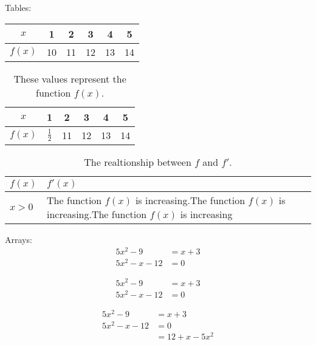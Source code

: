 \documentclass[11pt]{article}
\begin{document}

Tables:\\

\begin{tabular}{|c||c|c|c|c|c|}
\hline
$x$ &1&2&3&4&5 \\ 
\hline
$f(x)$ &10&11&12&13&14 \\
\hline
\end{tabular}

\vspace{1 cm}
\begin{table}[H]
\centering
\def\arraystretch{1.5}
\begin{tabular}{|c||c|c|c|c|c|}
\hline
$x$ &1&2&3&4&5 \\
\hline
$f(x)$ &$\frac{1}{2}$&11&12&13&14 \\ 
\hline
\end{tabular}
\caption{These values represent the function $f(x)$.}
\end{table}

\begin{table}[H]
\centering
\caption{The realtionship between $f$ and $f'$.}
\def\arraystretch{1.5}
\begin{tabular}{|l|p{3 in}|}
\hline
$f(x)$ &$f'(x)$ \\
\hline
$x>0$ &The function $f(x)$ is increasing.The function $f(x)$ is increasing.The function $f(x)$ is increasing \\ 
\hline
\end{tabular}
\end{table}

Arrays:
\begin{align}
5x^2 - 9 &= x +3\\
5x^2 -x -12 &= 0
\end{align}

\begin{align}
5x^2 - 9 &= x +3\\
5x^2 -x -12 &= 0
\end{align}

\begin{align*}
5x^2 - 9 &= x +3\\
5x^2 -x -12 &= 0\\
&=12+x-5x^2
\end{align*}
\end{document}
